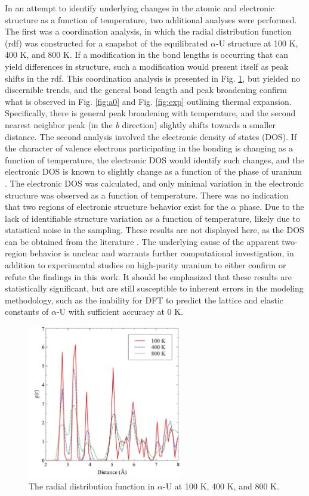 \documentclass[utf8]{frontiersSCNS} %
\begin{document}
In an attempt to identify underlying changes in the atomic and electronic structure as a function of temperature, two additional analyses were performed. The first was a coordination analysis, in which the radial distribution function (rdf) was constructed for a snapshot of the equilibrated $\alpha$-U structure at 100 K, 400 K, and 800 K. If a modification in the bond lengths is occurring that can yield differences in structure, such a modification would present itself as peak shifts in the rdf. This coordination analysis is presented in Fig. \ref{fig:rdf}, but yielded no discernible trends, and the general bond length and peak broadening confirm what is observed in Fig. \ref{fig:a0} and Fig. \ref{fig:exp} outlining thermal expansion. Specifically, there is general peak broadening with temperature, and the second nearest neighbor peak (in the \textit{b} direction) slightly shifts towards a smaller distance. The second analysis involved the electronic density of states (DOS). If the character of valence electrons participating in the bonding is changing as a function of temperature, the electronic DOS would identify such changes, and the electronic DOS is known to slightly change as a function of the phase of uranium \cite{beeler2013}. The electronic DOS was calculated, and only minimal variation in the electronic structure was observed as a function of temperature. There was no indication that two regions of electronic structure behavior exist for the $\alpha$ phase. Due to the lack of identifiable structure variation as a function of temperature, likely due to statistical noise in the sampling. These results are not displayed here, as the DOS can be obtained from the literature \cite{beeler2013,hood2008}. The underlying cause of the apparent two-region behavior is unclear and warrants further computational investigation, in addition to experimental studies on high-purity uranium to either confirm or refute the findings in this work. It should be emphasized that these results are statistically significant, but are still susceptible to inherent errors in the modeling methodology, such as the inability for DFT to predict the lattice and elastic constants of $\alpha$-U with sufficient accuracy at 0 K. 

 \begin{figure}[hbt]
	\centering
	\includegraphics[width=0.6\textwidth]{rdfs.jpg}
  \caption{The radial distribution function in $\alpha$-U at 100 K, 400 K, and 800 K. }\label{fig:rdf}
\end{figure}
\end{document}
